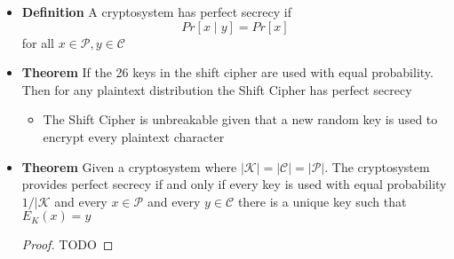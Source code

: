\message{ !name(crypto-noter.tex)}\documentclass[a4, english]{article}
\begin{document}
\begin{itemize}
\begin{equation*}
  \end{equation*}
  \item \textbf{Definition} A cryptosystem has perfect secrecy if 
  \begin{equation*}
    Pr[x \mid y] = Pr [x]
  \end{equation*}
  for all $x \in \mathcal P, y \in \mathcal C$
  \item \textbf{Theorem} If the 26 keys in the shift cipher are used with equal probability. Then for any plaintext distribution the Shift Cipher has perfect secrecy
  \begin{itemize}
	  \item The Shift Cipher is unbreakable given that a new random key is used to encrypt every plaintext character
  \end{itemize}
  \item \textbf{Theorem} Given a cryptosystem where $|\mathcal K| = | \mathcal C| = |\mathcal P|$. The cryptosystem provides perfect secrecy if and only if every key is used with equal probability $1/|\mathcal K$ and every $x \in \mathcal P$ and every $y \in \mathcal C$ there is a unique key such that $E_K(x) = y$
  \begin{proof} 
    TODO 
  \end{proof}
\end{itemize}
\end{document}
